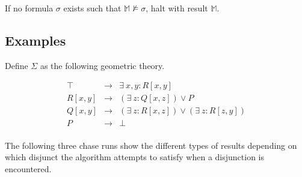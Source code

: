 		If no formula $\sigma$ exists such that $\mathbb{M} \not\models
		\sigma$, halt with result $\mathbb{M}$.

	\subsection{Examples}

		Define $\Sigma$ as the following geometric theory.

		\begin{eqnarray}
			\top    &  \to  &  \exists\ x,y : R[x,y]                             \\
			R[x,y]  &  \to  &  (\exists\ z : Q[x,z]) \vee P                      \\
			Q[x,y]  &  \to  &  (\exists\ z : R[x,z]) \vee (\exists\ z : R[z,y])  \\
			P       &  \to  &  \bot                                              \\
		\end{eqnarray}

		The following three chase runs show the different types of results
		depending on which disjunct the algorithm attempts to satisfy when a
		disjunction is encountered.

